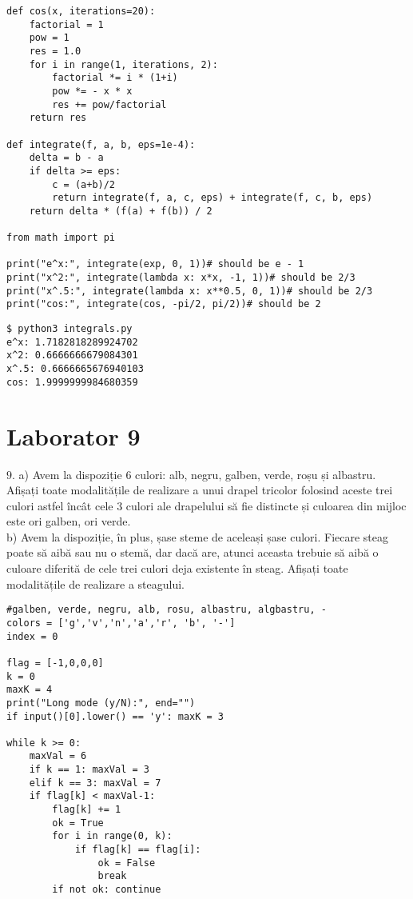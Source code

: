 \documentclass[11pt]{article}
\begin{document}
\begin{itemize}
\begin{itemize}
\begin{verbatim}
def cos(x, iterations=20):
    factorial = 1
    pow = 1
    res = 1.0
    for i in range(1, iterations, 2):
        factorial *= i * (1+i)
        pow *= - x * x
        res += pow/factorial
    return res

def integrate(f, a, b, eps=1e-4):
    delta = b - a
    if delta >= eps: 
        c = (a+b)/2
        return integrate(f, a, c, eps) + integrate(f, c, b, eps)
    return delta * (f(a) + f(b)) / 2

from math import pi

print("e^x:", integrate(exp, 0, 1))# should be e - 1
print("x^2:", integrate(lambda x: x*x, -1, 1))# should be 2/3
print("x^.5:", integrate(lambda x: x**0.5, 0, 1))# should be 2/3
print("cos:", integrate(cos, -pi/2, pi/2))# should be 2
\end{verbatim}

\begin{verbatim}
$ python3 integrals.py
e^x: 1.7182818289924702
x^2: 0.6666666679084301
x^.5: 0.6666665676940103
cos: 1.9999999984680359
\end{verbatim}

\pagebreak

\section*{Laborator 9}
\label{sec:orgdbbfadf}

\(9\). a) Avem la dispoziție 6 culori: alb, negru, galben, verde, roșu și albastru. Afișați toate modalitățile de realizare a unui drapel tricolor folosind aceste trei culori astfel încât cele 3 culori ale drapelului să fie distincte și culoarea din mijloc este ori galben, ori verde.\\
b) Avem la dispoziție, în plus, șase steme de aceleași șase culori. Fiecare steag poate să aibă sau nu o stemă, dar dacă are, atunci aceasta trebuie să aibă o culoare diferită de cele trei culori deja existente în steag. Afișați toate modalitățile de realizare a steagului.

\begin{verbatim}
#galben, verde, negru, alb, rosu, albastru, algbastru, -
colors = ['g','v','n','a','r', 'b', '-']
index = 0

flag = [-1,0,0,0]
k = 0
maxK = 4
print("Long mode (y/N):", end="")
if input()[0].lower() == 'y': maxK = 3

while k >= 0:
    maxVal = 6
    if k == 1: maxVal = 3
    elif k == 3: maxVal = 7
    if flag[k] < maxVal-1:
        flag[k] += 1
        ok = True
        for i in range(0, k):
            if flag[k] == flag[i]: 
                ok = False
                break
        if not ok: continue


\end{verbatim}
\end{itemize}
\end{itemize}
\end{document}
